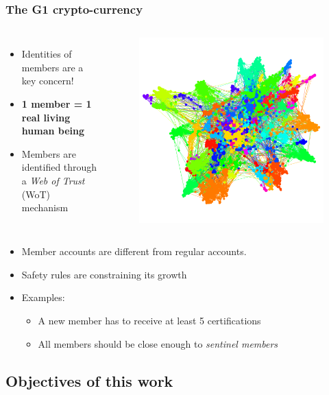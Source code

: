 \documentclass{beamer}
\begin{document}
\begin{frame}
	\frametitle{The G1 crypto-currency}
	\begin{columns}[c]
		\begin{itemize}
			\item Identities of members are a key concern!
			\item \textbf{1 member = 1 real living human being}
			\item Members are identified through a \textit{Web of Trust} (WoT) mechanism
		\end{itemize}
		\begin{figure}
			\includegraphics[width=.7\linewidth]{./figures/wot}
		\end{figure}
	\end{columns}
	\begin{itemize}
		\item Member accounts are different from regular accounts.
		\item Safety rules are constraining its growth
		\item Examples:
		\begin{itemize}
			\item A new member has to receive at least 5 certifications
			\item All members should be close enough to 				\textit{sentinel members}
		\end{itemize}
	\end{itemize}
\end{frame}


\subsection{Objectives of this work}
\end{document}
